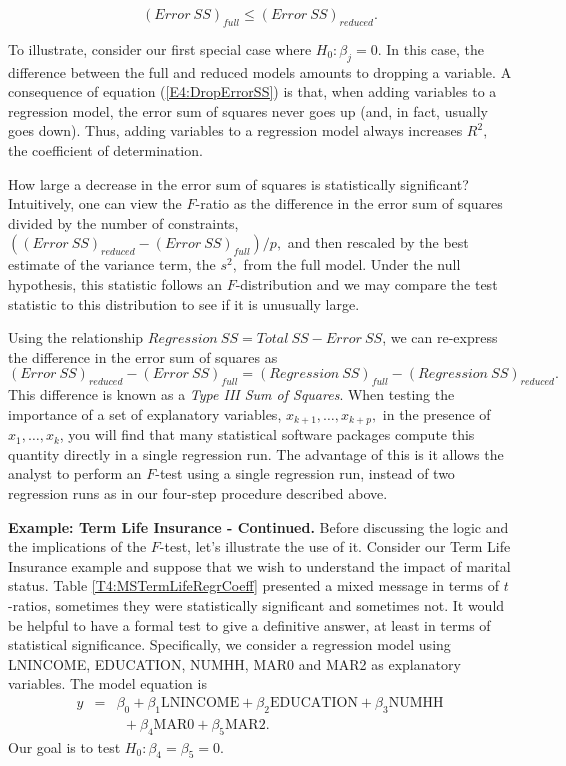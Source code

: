 \begin{equation}\label{E4:DropErrorSS}
(Error~SS)_{full}\leq (Error~SS)_{reduced}.
\end{equation}

To illustrate, consider our first special case where $H_0 : \beta_j
= 0$. In this case, the difference between the full and reduced
models amounts to dropping a variable. A consequence of equation
(\ref{E4:DropErrorSS}) is that, when adding variables to a
regression model, the error sum of squares never goes up (and, in
fact, usually goes down). Thus, adding variables to a regression
model always increases $R^2,$ the coefficient of determination.

How large a decrease in the error sum of squares is statistically
significant? Intuitively, one can view the $F$-ratio as the
difference in the error sum of squares divided by the number of
constraints, $((Error~SS)_{reduced}-(Error~SS)_{full})/p,$ and then
rescaled by the best estimate of the variance term, the $s^{2},$
from the full model. Under the null hypothesis, this statistic
follows an $F$-distribution and we may compare the test statistic to
this distribution to see if it is unusually large.

Using the relationship $Regression~SS=Total~SS-Error~SS$, we can
re-express the difference in the error sum of squares as
\begin{equation*}
(Error~SS)_{reduced}-(Error~SS)_{full}=(Regression~SS)_{full}-(Regression~SS)_{reduced}.
\end{equation*} 
This difference is known as a \emph{Type III Sum of Squares}. When
testing the importance of a set of explanatory variables,
$x_{k+1},\ldots,x_{k+p},$ in the presence of $x_1,\ldots,x_k$, you
will find that many statistical software packages compute this
quantity directly in a single regression run. The advantage of this
is it allows the analyst to perform an $F$-test using a single
regression run, instead of two regression runs as in our four-step
procedure described above.

\linejed

\textbf{Example: Term Life Insurance - Continued.} Before discussing
the logic and the implications of the $F$-test, let's illustrate the
use of it. Consider our Term Life Insurance example and suppose that
we wish to understand the impact of marital status. Table
\ref{T4:MSTermLifeRegrCoeff} presented a mixed message in terms of
$t$-ratios, sometimes they were statistically significant and
sometimes not. It would be helpful to have a formal test to give a
definitive answer, at least in terms of statistical significance.
Specifically, we consider a regression model using LNINCOME,
EDUCATION, NUMHH, MAR0 and MAR2 as explanatory variables. The model
equation is
\begin{eqnarray*}
y &=& \beta_0 + \beta_1 \textrm{LNINCOME} +\beta_2
\textrm{EDUCATION} + \beta_3 \textrm{NUMHH} \\
 & & ~~ +\beta_4 \textrm{MAR0} +\beta_5\textrm{MAR2}.
\end{eqnarray*}
Our goal is to test $H_0: \beta_4 = \beta_5 = 0 $.

